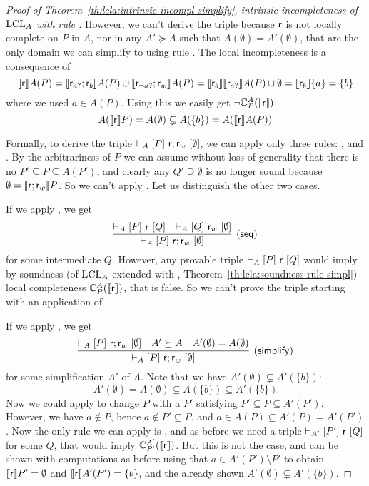 \begin{proof}[Proof of Theorem~\ref{th:lcla:intrinsic-incompl-simplify}, intrinsic incompleteness of $\text{LCL}_A$ with rule ]
	However, we can't derive the triple because $\mathsf{r}$ is not locally complete on $P$ in $A$, nor in any $A' \succeq A$ such that $A(\emptyset) = A'(\emptyset)$, that are the only domain we can simplify to using rule . The local incompleteness is a consequence of
	\[
	\llbracket\mathsf{r}\rrbracket A(P) = \llbracket\mathsf{r}_{a?}; \mathsf{r}_{b}\rrbracket A(P) \cup \llbracket\mathsf{r}_{\lnot a?}; \mathsf{r}_w\rrbracket A(P) = \llbracket\mathsf{r}_{b}\rrbracket \llbracket\mathsf{r}_{a?}\rrbracket A(P) \cup \emptyset = \llbracket\mathsf{r}_{b}\rrbracket \{ a \} = \{ b \}
	\]
	where we used $a \in A(P)$. Using this we easily get $\lnot \mathbb{C}^{A}_{P}(\llbracket\mathsf{r}\rrbracket)$:
	\[
	A(\llbracket\mathsf{r}\rrbracket P) = A(\emptyset) \subsetneq A(\{ b \}) = A(\llbracket\mathsf{r}\rrbracket A(P))
	\]

	Formally, to derive the triple $\vdash_{A}\nobreak[P]~\mathsf{r}; \mathsf{r}_w~[\emptyset]$, we can apply only three rules: ,  and . By the arbitrariness of $P$ we can assume without loss of generality that there is no $P' \subseteq P \subseteq A(P')$, and clearly any $Q' \supseteq \emptyset$ is no longer sound because $\emptyset = \llbracket\mathsf{r}; \mathsf{r}_w\rrbracket P$. So we can't apply . Let us distinguish the other two cases.

	\noindent If we apply , we get
	\[
	\infer[(\mathsf{seq})]{\lcl{A}{P}{\regr; \regr_w}{\emptyset}}{\lcl{A}{P}{\regr}{Q} & \lcl{A}{Q}{\regr_w}{\emptyset}}
	\]
	for some intermediate $Q$. However, any provable triple $\vdash_{A}\nobreak[P]~\mathsf{r}~[Q]$ would imply by soundness (of $\text{LCL}_A$ extended with , Theorem~\ref{th:lcla:soundness-rule-simpl}) local completeness $\mathbb{C}^{A}_{P}(\llbracket\mathsf{r}\rrbracket)$, that is false. So we can't prove the triple starting with an application of 

	\noindent If we apply , we get
	\[
	\infer[(\mathsf{simplify})]{\lcl{A}{P}{\regr; \regr_w}{\emptyset}}{\lcl{A}{P}{\regr; \regr_w}{\emptyset} & A' \succeq A & A'(\emptyset) = A(\emptyset)}
	\]
	for some simplification $A'$ of $A$. Note that we have $A'(\emptyset) \subsetneq A'(\{ b \})$:
	\[
	A'(\emptyset) = A(\emptyset) \subsetneq A(\{ b \}) \subseteq A'(\{ b \})
	\]
	Now we could apply  to change $P$ with a $P'$ satisfying $P' \subseteq P \subseteq A'(P')$. However, we have $a \notin P$, hence $a \notin P' \subseteq P$, and $a \in A(P) \subseteq A'(P) = A'(P')$. Now the only rule we can apply is , and as before we need a triple $\vdash_{A'}\nobreak[P']~\mathsf{r}~[Q]$ for some $Q$, that would imply $\mathbb{C}^{A'}_{P'}(\llbracket\mathsf{r}\rrbracket)$. But this is not the case, and can be shown with computations as before using that $a \in A'(P') \setminus P'$ to obtain $\llbracket\mathsf{r}\rrbracket P' = \emptyset$ and $\llbracket\mathsf{r}\rrbracket A'(P') = \{ b \}$, and the already shown $A'(\emptyset) \subsetneq A'(\{ b \})$.
\end{proof}

